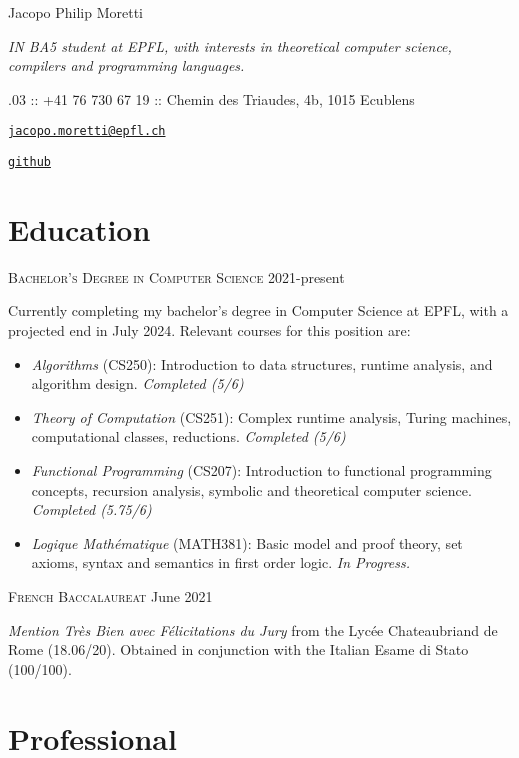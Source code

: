 \documentclass[10pt]{article}
\renewcommand{\url}[1]{{\texttt{#1}}}
\renewcommand{\line}[2]{{\vspace{4pt} \large \noindent\textsc{#1} \hfill #2}\vspace{4pt}}
\begin{document}
  \begin{center}
    \huge Jacopo Philip Moretti
  \end{center}

  \begin{adjustwidth}{1in}{1in}
    \textit{IN BA5 student at EPFL, with interests in theoretical computer science, compilers and programming languages.}

    .03 :: +41 76 730 67 19 :: Chemin des Triaudes, 4b, 1015 Ecublens

    \noindent \href{https://people.epfl.ch/jacopo.moretti}{\url{jacopo.moretti@epfl.ch}}

    \noindent \href{https://github.com/quartztz}{\url{github}}
  \end{adjustwidth}

  \section*{Education}

  \line{Bachelor's Degree in Computer Science}{2021-present}

  Currently completing my bachelor's degree in Computer Science at EPFL, with a projected end in July 2024. Relevant courses for this position are: 
  \begin{itemize}
    \item \textit{Algorithms} (CS250): Introduction to data structures, runtime analysis, and algorithm design. \textit{Completed (5/6)}
    \item \textit{Theory of Computation} (CS251): Complex runtime analysis, Turing machines, computational classes, reductions. \textit{Completed (5/6)}
    \item \textit{Functional Programming} (CS207): Introduction to functional programming concepts, recursion analysis, symbolic and theoretical computer science. \textit{Completed (5.75/6)}
    \item \textit{Logique Mathématique} (MATH381): Basic model and proof theory, set axioms, syntax and semantics in first order logic. \textit{In Progress.}
  \end{itemize}

  \line{French Baccalaureat}{June 2021}

  \textit{Mention Très Bien avec Félicitations du Jury} from the Lycée Chateaubriand de Rome (18.06/20). Obtained in conjunction with the Italian Esame di Stato (100/100).
  
  \section*{Professional}
\end{document}
